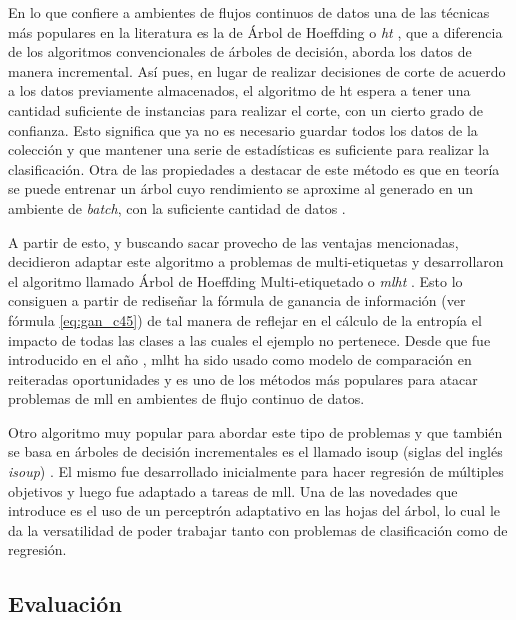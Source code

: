 En lo que confiere a ambientes de flujos continuos de datos una de las técnicas
más populares en la literatura es la de Árbol de Hoeffding o
\textit{\acrfull{ht}} \cite{domingos_mining_2002}, que a diferencia de los
algoritmos convencionales de árboles de decisión, aborda los datos de manera
incremental. Así pues, en lugar de realizar decisiones de corte de acuerdo a los
datos previamente almacenados, el algoritmo de \acrshort{ht} espera a tener una
cantidad suficiente de instancias para realizar el corte, con un cierto grado de
confianza. Esto significa que ya no es necesario guardar todos los datos de la
colección y que mantener una serie de estadísticas es suficiente para realizar
la clasificación. Otra de las propiedades a destacar de este método es que en
teoría se puede entrenar un árbol cuyo rendimiento se aproxime al generado en un
ambiente de \textit{batch}, con la suficiente cantidad de datos
\cite{bifet_machine_2018}. 

A partir de esto, y buscando sacar provecho de las ventajas mencionadas,
\citeauthor{read_scalable_2012} decidieron adaptar este algoritmo a problemas de
multi-etiquetas y desarrollaron el algoritmo llamado Árbol de Hoeffding
Multi-etiquetado o \textit{\acrfull{mlht}} \cite{read_scalable_2012}. Esto lo
consiguen a partir de rediseñar la fórmula de ganancia de información (ver
fórmula \ref{eq:gan_c45}) de tal manera de reflejar en el cálculo de la entropía
el impacto de todas las clases a las cuales el ejemplo no pertenece. Desde que
fue introducido en el año \citeyear{read_scalable_2012}, \acrshort{mlht} ha sido
usado como modelo de comparación en reiteradas oportunidades
\cite{sousa_multi-label_2018} y es uno de los métodos más populares para atacar
problemas de \acrshort{mll} en ambientes de flujo continuo de datos.

Otro algoritmo muy popular para abordar este tipo de problemas y que también se
basa en árboles de decisión incrementales es el llamado \acrshort{isoup} (siglas
del inglés \textit{\acrlong{isoup}}) \cite{osojnik_multi-label_2017}. El mismo
fue desarrollado inicialmente para hacer regresión de múltiples objetivos y
luego fue adaptado a tareas de \acrshort{mll}. Una de las novedades que
introduce es el uso de un perceptrón adaptativo en las hojas del árbol, lo cual
le da la versatilidad de poder trabajar tanto con problemas de clasificación
como de regresión.


\subsection{Evaluación}
\label{mll_evaluacion}

